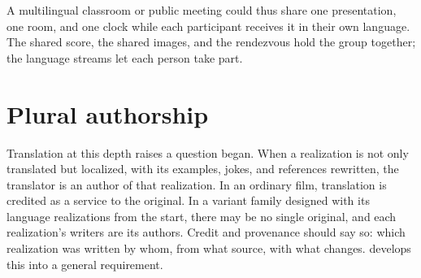 A multilingual classroom or public meeting could thus share one presentation, one room, and one clock while each participant receives it in their own language. The shared score, the shared images, and the rendezvous hold the group together; the language streams let each person take part.

\section{Plural authorship}

Translation at this depth raises a question  began. When a realization is not only translated but localized, with its examples, jokes, and references rewritten, the translator is an author of that realization. In an ordinary film, translation is credited as a service to the original. In a variant family designed with its language realizations from the start, there may be no single original, and each realization's writers are its authors. Credit and provenance should say so: which realization was written by whom, from what source, with what changes.  develops this into a general requirement.
